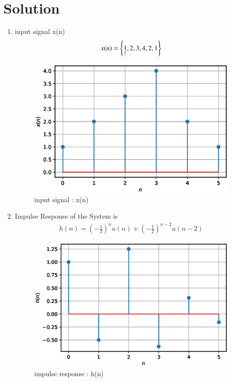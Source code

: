 \documentclass[journal,12pt,twocolumn]{IEEEtran}
\renewcommand\thesection{\arabic{section}}
\begin{document}
\section{Solution}
\begin{enumerate}[label=\thesection.\arabic*.,ref=\thesection.\theenumi]

\item input signal x(n)
\begin{align}
    x(n) = \left\{\underset{\uparrow}{1},2,3,4,2,1\right\} 
\end{align}
 \begin{figure}[h!]
    \centering
    \includegraphics[width=\columnwidth]{./figs/x_n.eps}
    \caption{input signal : x(n)}
    \label{xn}
\end{figure}
\item Impulse Response of the System is
\begin{align}
    h(n)=\left(-\frac{1}{2}\right)^{n} u(n)+\left(-\frac{1}{2}\right)^{n-2} u(n-2)	
\end{align}

 \begin{figure}[ht]
    \centering
    \includegraphics[width=\columnwidth]{./figs/h_n.eps}
    \caption{impulse response : h(n)}
    \label{hn}
\end{figure}


\end{enumerate}
\end{document}
